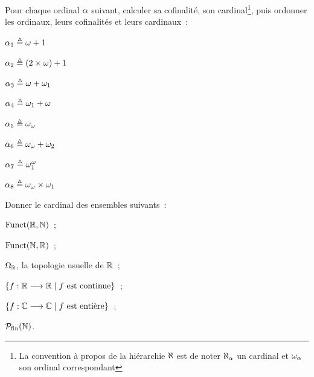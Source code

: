 \begin{exercise}
  Pour chaque ordinal $\alpha$ suivant, calculer sa cofinalité, son
  cardinal\footnote{La convention à propos de la hiérarchie $\aleph$ est de
  noter $\aleph_{\alpha}$ un cardinal et $\omega_{\alpha}$ son ordinal correspondant},
  puis ordonner les ordinaux, leurs cofinalités et leurs cardinaux~:

  \vspace{5pt}
  \begin{enumerate}[label=(\roman*)]
    \begin{minipage}{0.45\textwidth}
    \item $\alpha_1 \triangleq \omega + 1$
    \item $\alpha_2 \triangleq (2\times \omega) + 1$
    \item $\alpha_3 \triangleq \omega + \omega_1$
    \item $\alpha_4 \triangleq \omega_1 + \omega$
    \end{minipage}
    \begin{minipage}{0.45\textwidth}
    \item $\alpha_5 \triangleq \omega_{\omega}$
    \item $\alpha_6 \triangleq \omega_{\omega} + \omega_2$
    \item $\alpha_7 \triangleq \omega_1^{\omega}$
    \item $\alpha_8 \triangleq \omega_{\omega}\times\omega_1$
    \end{minipage}
  \end{enumerate}
\end{exercise}

\begin{exercise}
  Donner le cardinal des ensembles suivants~:

  \vspace{5pt}
  \begin{enumerate}[label=(\roman*)]
    \begin{minipage}{0.45\textwidth}
    \item $\operatorname{Funct}(\mathbb R,\mathbb N)$~;
    \item $\operatorname{Funct}(\mathbb N,\mathbb R)$~;
    \item $\Omega_{\mathbb R}$, la topologie usuelle de $\mathbb R$~;
    \end{minipage}
    \begin{minipage}{0.45\textwidth}
    \item $\left\{ f : \displaystyle \mathbb R \longrightarrow \mathbb R \;\middle\vert\; f\text{ est continue} \right\}$~;
    \item $\left\{ f : \displaystyle \mathbb C \longrightarrow \mathbb C \;\middle\vert\; f\text{ est entière} \right\}$~;
    \item $\mathcal{P}_{\mathrm{fin}}(\mathbb N)$.
    \end{minipage}
  \end{enumerate}
\end{exercise}

